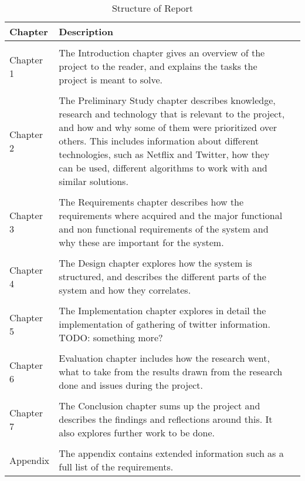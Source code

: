 \begin{table}
\centering
\begin{tabularx}{\textwidth}{ l X l }
  \textbf{Chapter}      & \textbf{Description} \\
  \hline \\ [-1.5ex]
  Chapter 1 & The Introduction chapter gives an overview of the project to the reader, and explains the tasks the project is meant to solve. \\
  \hline \\ [-1.5ex]
  Chapter 2 & The Preliminary Study chapter describes knowledge, research and technology that is relevant to the project, and how and why some of them were prioritized over others. This includes information about different technologies, such as Netflix and Twitter, how they can be used, different algorithms to work with and similar solutions. \\
  \hline \\ [-1.5ex]
  Chapter 3 & The Requirements chapter describes how the requirements where acquired and the major functional and non functional requirements of the system and why these are important for the system. \\
  \hline \\ [-1.5ex]
  Chapter 4 & The Design chapter explores how the system is structured, and describes the different parts of the system and how they correlates. \\
  \hline \\ [-1.5ex]
  Chapter 5 & The Implementation chapter explores in detail the implementation of gathering of twitter information. TODO: something more?  \\
  \hline \\ [-1.5ex]
  Chapter 6 & Evaluation chapter includes how the research went, what to take from the results drawn from the research done and issues during the project. \\
  \hline \\ [-1.5ex]
  Chapter 7 & The Conclusion chapter sums up the project and describes the findings and reflections around this. It also explores further work to be done. \\
  \hline \\ [-1.5ex]
  Appendix & The appendix contains extended information such as a full list of the requirements. \\
\end{tabularx}
\caption{Structure of Report}
\label{table-reportstructure}
\end{table}

